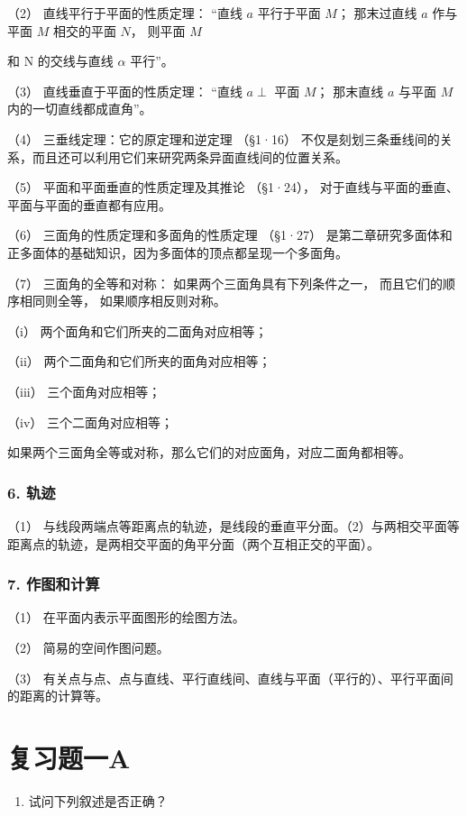 （2） 直线平行于平面的性质定理： ``直线 \(a\) 平行于平面 \(M\)；
那末过直线 \(a\) 作与平面 \(M\) 相交的平面 \(N\)， 则平面 \(M\)

和 N 的交线与直线 \(\alpha\) 平行''。

（3） 直线垂直于平面的性质定理： ``直线 \(a \perp\) 平面 \(M\)；
那末直线 \(a\) 与平面 \(M\) 内的一切直线都成直角''。

（4） 三垂线定理：它的原定理和逆定理 （§1·16）
不仅是刻划三条垂线间的关系，而且还可以利用它们来研究两条异面直线间的位置关系。

（5） 平面和平面垂直的性质定理及其推论 （§1·24），
对于直线与平面的垂直、平面与平面的垂直都有应用。

（6） 三面角的性质定理和多面角的性质定理 （§1·27）
是第二章研究多面体和正多面体的基础知识，因为多面体的顶点都呈现一个多面角。

（7） 三面角的全等和对称： 如果两个三面角具有下列条件之一，
而且它们的顺序相同则全等， 如果顺序相反则对称。

（i） 两个面角和它们所夹的二面角对应相等；

（ii） 两个二面角和它们所夹的面角对应相等；

（iii） 三个面角对应相等；

（iv） 三个二面角对应相等；

如果两个三面角全等或对称，那么它们的对应面角，对应二面角都相等。

\subsubsection{6. 轨迹}

（1）
与线段两端点等距离点的轨迹，是线段的垂直平分面。（2）与两相交平面等距离点的轨迹，是两相交平面的角平分面（两个互相正交的平面）。

\subsubsection{7. 作图和计算}

（1） 在平面内表示平面图形的绘图方法。

（2） 简易的空间作图问题。

（3）
有关点与点、点与直线、平行直线间、直线与平面（平行的）、平行平面间的距离的计算等。

\section{复习题一A}

\begin{enumerate}
\item
  试问下列叙述是否正确？
\end{enumerate}

